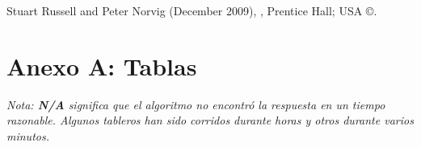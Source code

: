 \documentclass[%
    final,
    reprint,
    notitlepage,
    narroweqnarray,
    inline,
    twoside,
    invited
    ]{ieee}
\begin{document}
%
%
%
%
%


\begin{thebibliography}{1}

Stuart Russell and Peter Norvig (December 2009),
,
\newblock Prentice Hall; USA \copyright.







\end{thebibliography}



\clearpage


\onecolumn
\section*{Anexo A: Tablas}

\textit{Nota: \textbf{N/A} significa que el algoritmo no encontró la respuesta en un tiempo razonable. Algunos tableros han sido corridos durante horas y otros durante varios minutos.}
\end{document}
